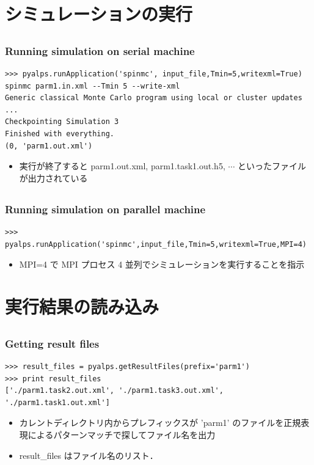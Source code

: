 \section{シミュレーションの実行}

\subsection*{\redm\whiteb\greenb}
\begin{frame}[t,fragile]
\frametitle{Running simulation on serial machine}
\begin{lstlisting}
>>> pyalps.runApplication('spinmc', input_file,Tmin=5,writexml=True)
spinmc parm1.in.xml --Tmin 5 --write-xml
Generic classical Monte Carlo program using local or cluster updates
...
Checkpointing Simulation 3
Finished with everything.
(0, 'parm1.out.xml')
\end{lstlisting}
\begin{itemize}
\item 実行が終了すると parm1.out.xml, parm1.task1.out.h5, $\cdots$ といったファイルが出力されている
\end{itemize}
\end{frame}

\subsection*{\redm\whitem\greenb}
\begin{frame}[t,fragile]
\frametitle{Running simulation on parallel machine}
\begin{lstlisting}
>>> pyalps.runApplication('spinmc',input_file,Tmin=5,writexml=True,MPI=4)
\end{lstlisting}
\begin{itemize}
\item MPI=4 で MPI プロセス 4 並列でシミュレーションを実行することを指示
\end{itemize}
\end{frame}

\section{実行結果の読み込み}

\subsection*{\redm\whiteb\greenb}
\begin{frame}[t,fragile]
 \frametitle{Getting result files}
\begin{lstlisting}
>>> result_files = pyalps.getResultFiles(prefix='parm1')
>>> print result_files
['./parm1.task2.out.xml', './parm1.task3.out.xml', './parm1.task1.out.xml']
\end{lstlisting}
 \begin{itemize}
  \item カレントディレクトリ内からプレフィックスが 'parm1' のファイルを正規表現によるパターンマッチで探してファイル名を出力
  \item result\_files はファイル名のリスト．
 \end{itemize}
\end{frame}

